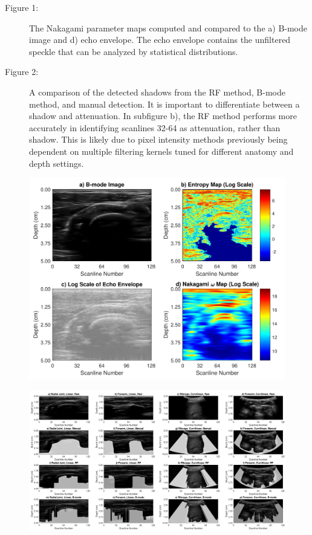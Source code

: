 \documentclass[preprint,5p,authoryear]{elsarticle}
\begin{document}
\begin{description}
\item[Figure 1:]  The Nakagami parameter maps computed and compared to the a) B-mode image and d) echo envelope. The echo envelope contains the unfiltered speckle that can be analyzed by statistical distributions.
\item[Figure 2:]  A comparison of the detected shadows from the RF method, B-mode method, and manual detection. It is important to differentiate between$  $ a shadow and attenuation. In subfigure b), the RF method performs more accurately in identifying scanlines 32-64 as attenuation, rather than shadow. This is likely due to pixel intensity methods previously being dependent on multiple filtering kernels tuned for different anatomy and depth settings.
\end{description}

\begin{figure}[H]
	\centering
	\includegraphics[scale=0.5]{fig2.pdf}
\end{figure}

\begin{figure}
	\centering
	\includegraphics[scale=0.4]{fig1.pdf}
\end{figure}
\end{document}
